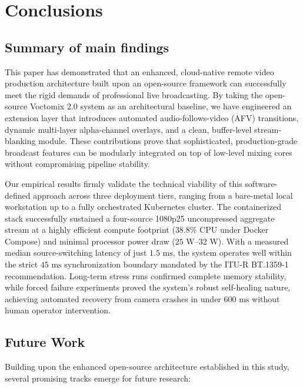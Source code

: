 \documentclass[electronics,article,submit,pdftex,moreauthors]{Definitions/mdpi}
\begin{document}
\section{Conclusions}
\label{sec:conclusions}

\subsection{Summary of main findings}

This paper has demonstrated that an enhanced, cloud-native remote video production architecture built upon an open-source framework can successfully meet the rigid demands of professional live broadcasting. By taking the open-source Voctomix 2.0 system as an architectural baseline, we have engineered an extension layer that introduces automated audio-follows-video (AFV) transitions, dynamic multi-layer alpha-channel overlays, and a clean, buffer-level stream-blanking module. These contributions prove that sophisticated, production-grade broadcast features can be modularly integrated on top of low-level mixing cores without compromising pipeline stability.

Our empirical results firmly validate the technical viability of this software-defined approach across three deployment tiers, ranging from a bare-metal local workstation up to a fully orchestrated Kubernetes cluster. The containerized stack successfully sustained a four-source 1080p25 uncompressed aggregate stream at a highly efficient compute footprint ($38.8\%$ CPU under Docker Compose) and minimal processor power draw ($25\text{ W}$--$32\text{ W}$). With a measured median source-switching latency of just $1.5\text{ ms}$, the system operates well within the strict $45\text{ ms}$ synchronization boundary mandated by the ITU-R BT.1359-1 recommendation. Long-term stress runs confirmed complete memory stability, while forced failure experiments proved the system’s robust self-healing nature, achieving automated recovery from camera crashes in under $600\text{ ms}$ without human operator intervention.

\subsection{Future Work}

Building upon the enhanced open-source architecture established in this study, several promising tracks emerge for future research:
\end{document}

